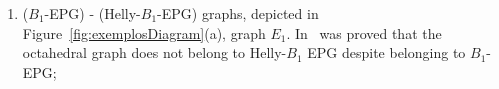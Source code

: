 
\begin{enumerate}[label=(\arabic*)]
    \item ($B_1$-EPG)  - (Helly-$B_1$-EPG) graphs, depicted in Figure~\ref{fig:exemplosDiagram}(a), graph $E_1$. In~\cite{bornstein2019,dmtcs:6506} was proved that the octahedral graph does not belong to Helly-$B_1$ EPG despite belonging to $B_1$-EPG;%
    

\end{enumerate}

